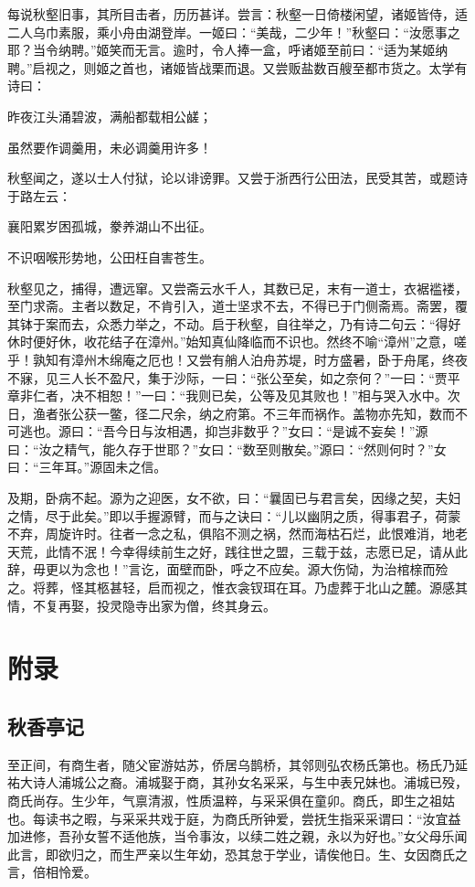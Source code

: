 \documentclass[a4paper,12pt,UTF8,twoside]{ctexbook}
\begin{document}
每说秋壑旧事，其所目击者，历历甚详。尝言：秋壑一日倚楼闲望，诸姬皆侍，适二人乌巾素服，乘小舟由湖登岸。一姬曰：“美哉，二少年！”秋壑曰：“汝愿事之耶？当令纳聘。”姬笑而无言。逾时，令人捧一盒，呼诸姬至前曰：“适为某姬纳聘。”启视之，则姬之首也，诸姬皆战栗而退。又尝贩盐数百艘至都市货之。太学有诗曰：

昨夜江头涌碧波，满船都载相公鹾；

虽然要作调羹用，未必调羹用许多！

秋壑闻之，遂以士人付狱，论以诽谤罪。又尝于浙西行公田法，民受其苦，或题诗于路左云：

襄阳累岁困孤城，豢养湖山不出征。

不识咽喉形势地，公田枉自害苍生。

秋壑见之，捕得，遭远窜。又尝斋云水千人，其数已足，末有一道士，衣裾褴褛，至门求斋。主者以数足，不肯引入，道士坚求不去，不得已于门侧斋焉。斋罢，覆其钵于案而去，众悉力举之，不动。启于秋壑，自往举之，乃有诗二句云：“得好休时便好休，收花结子在漳州。”始知真仙降临而不识也。然终不喻“漳州”之意，嗟乎！孰知有漳州木绵庵之厄也！又尝有艄人泊舟苏堤，时方盛暑，卧于舟尾，终夜不寐，见三人长不盈尺，集于沙际，一曰：“张公至矣，如之奈何？”一曰：“贾平章非仁者，决不相恕！”一曰：“我则已矣，公等及见其败也！”相与哭入水中。次日，渔者张公获一鳖，径二尺余，纳之府第。不三年而祸作。盖物亦先知，数而不可逃也。源曰：“吾今日与汝相遇，抑岂非数乎？”女曰：“是诚不妄矣！”源曰：“汝之精气，能久存于世耶？”女曰：“数至则散矣。”源曰：“然则何时？”女曰：“三年耳。”源固未之信。

及期，卧病不起。源为之迎医，女不欲，曰：“曩固已与君言矣，因缘之契，夫妇之情，尽于此矣。”即以手握源臂，而与之诀曰：“儿以幽阴之质，得事君子，荷蒙不弃，周旋许时。往者一念之私，俱陷不测之祸，然而海枯石烂，此恨难消，地老天荒，此情不泯！今幸得续前生之好，践往世之盟，三载于兹，志愿已足，请从此辞，毋更以为念也！”言讫，面壁而卧，呼之不应矣。源大伤恸，为治棺榇而殓之。将葬，怪其柩甚轻，启而视之，惟衣衾钗珥在耳。乃虚葬于北山之麓。源感其情，不复再娶，投灵隐寺出家为僧，终其身云。

\backmatter

\part{附录}

\chapter{秋香亭记}

至正间，有商生者，随父宦游姑苏，侨居乌鹊桥，其邻则弘农杨氏第也。杨氏乃延祐大诗人浦城公之裔。浦城娶于商，其孙女名采采，与生中表兄妹也。浦城已殁，商氏尚存。生少年，气禀清淑，性质温粹，与采采俱在童卯。商氏，即生之祖姑也。每读书之暇，与采采共戏于庭，为商氏所钟爱，尝抚生指采采谓曰：“汝宜益加进修，吾孙女誓不适他族，当令事汝，以续二姓之親，永以为好也。”女父母乐闻此言，即欲归之，而生严亲以生年幼，恐其怠于学业，请俟他日。生、女因商氏之言，倍相怜爱。
\end{document}
